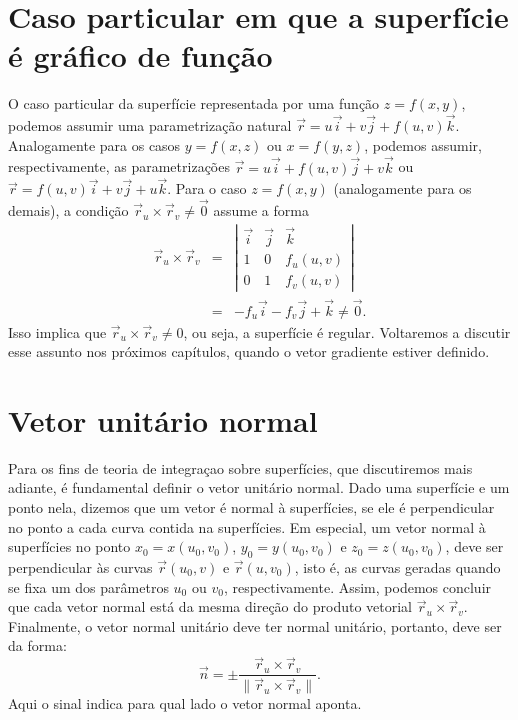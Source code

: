 \section{Caso particular em que a superfície é gráfico de função}
O caso particular da superfície representada por uma função $z=f(x,y)$, podemos assumir uma parametrização natural $\vec{r}=u\vec{i}+v\vec{j}+f(u,v)\vec{k}$. Analogamente para os casos $y=f(x,z)$ ou $x=f(y,z)$, podemos assumir, respectivamente, as parametrizações $\vec{r}=u\vec{i}+f(u,v)\vec{j}+v\vec{k}$ ou $\vec{r}=f(u,v)\vec{i}+v\vec{j}+u\vec{k}$. Para o caso $z=f(x,y)$ (analogamente para os demais), a condição $\vec{r}_u\times \vec{r}_v\neq \vec{0}$ assume a forma
\begin{eqnarray*}
 \vec{r}_u\times \vec{r}_v&=&\left|\begin{array}{ccc}\vec{i}&\vec{j}&\vec{k}\\ 1&0&f_u(u,v)\\0&1&f_v(u,v)\end{array} \right|\\&=&-f_u\vec{i}-f_v\vec{j}+\vec{k}\neq \vec{0}.
\end{eqnarray*}
Isso implica que $ \vec{r}_u\times \vec{r}_v \neq 0$, ou seja, a superfície \'{e} regular. Voltaremos a discutir esse assunto nos próximos capítulos, quando o vetor gradiente estiver definido.
\section{Vetor unitário normal}
Para os fins de teoria de integraçao sobre superfícies, que discutiremos mais adiante, é fundamental definir o vetor unitário normal. Dado uma superfície e um ponto nela, dizemos que um vetor é normal à superfícies, se ele é perpendicular no ponto a cada curva contida na superfícies. Em especial, um vetor normal à superfícies no ponto $x_0=x(u_0,v_0)$, $y_0=y(u_0,v_0)$ e $z_0=z(u_0,v_0)$, deve ser perpendicular às curvas $\vec{r}(u_0,v)$ e $\vec{r}(u,v_0)$, isto é, as curvas geradas quando se fixa um dos parâmetros $u_0$ ou $v_0$, respectivamente. Assim, podemos concluir que cada vetor normal está da mesma direção do produto vetorial $\vec{r}_u\times\vec{r}_v$. Finalmente, o vetor normal unitário deve ter normal unitário, portanto, deve ser da forma:
\begin{equation}
 \vec{n} = \pm \frac{\vec{r}_u\times\vec{r}_v}{\|\vec{r}_u\times\vec{r}_v\|}.
\end{equation}
Aqui o sinal indica para qual lado o vetor normal aponta.
